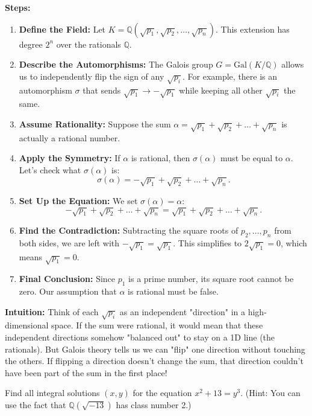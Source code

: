 \begin{solution}
\textbf{Steps:}
\begin{enumerate}
    \item \textbf{Define the Field:} Let $K = \mathbb{Q}(\sqrt{p_1}, \sqrt{p_2}, \dots, \sqrt{p_n})$. This extension has degree $2^n$ over the rationals $\mathbb{Q}$.
    \item \textbf{Describe the Automorphisms:} The Galois group $G = \text{Gal}(K/\mathbb{Q})$ allows us to independently flip the sign of any $\sqrt{p_i}$. For example, there is an automorphism $\sigma$ that sends $\sqrt{p_1} \to -\sqrt{p_1}$ while keeping all other $\sqrt{p_i}$ the same.
    \item \textbf{Assume Rationality:} Suppose the sum $\alpha = \sqrt{p_1} + \sqrt{p_2} + \dots + \sqrt{p_n}$ is actually a rational number.
    \item \textbf{Apply the Symmetry:} If $\alpha$ is rational, then $\sigma(\alpha)$ must be equal to $\alpha$. Let's check what $\sigma(\alpha)$ is:
    $$\sigma(\alpha) = -\sqrt{p_1} + \sqrt{p_2} + \dots + \sqrt{p_n}.$$
    \item \textbf{Set Up the Equation:} We set $\sigma(\alpha) = \alpha$:
    $$-\sqrt{p_1} + \sqrt{p_2} + \dots + \sqrt{p_n} = \sqrt{p_1} + \sqrt{p_2} + \dots + \sqrt{p_n}.$$
    \item \textbf{Find the Contradiction:} Subtracting the square roots of $p_2, \dots, p_n$ from both sides, we are left with $-\sqrt{p_1} = \sqrt{p_1}$. This simplifies to $2\sqrt{p_1} = 0$, which means $\sqrt{p_1} = 0$.
    \item \textbf{Final Conclusion:} Since $p_1$ is a prime number, its square root cannot be zero. Our assumption that $\alpha$ is rational must be false.
\end{enumerate}

\textbf{Intuition:}
Think of each $\sqrt{p_i}$ as an independent "direction" in a high-dimensional space. If the sum were rational, it would mean that these independent directions somehow "balanced out" to stay on a 1D line (the rationals). But Galois theory tells us we can "flip" one direction without touching the others. If flipping a direction doesn't change the sum, that direction couldn't have been part of the sum in the first place!
\end{solution}

\begin{exercise}
\label{algebra:2021:5}
Find all integral solutions $(x, y)$ for the equation $x^2 + 13 = y^3$. (Hint: You can use the fact that $\mathbb{Q}(\sqrt{-13})$ has class number 2.)
\end{exercise}

